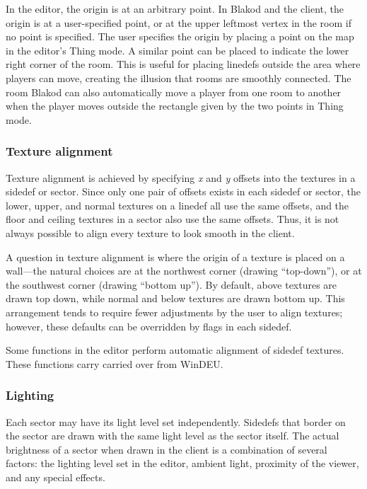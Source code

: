 In the editor, the origin is at an arbitrary point.  In Blakod and the
client, the origin is at a user-specified point, or at the upper
leftmost vertex in the room if no point is specified.  The user
specifies the origin by placing a point on the map in the editor's
Thing mode.  A similar point can be placed to indicate the lower right
corner of the room.  This is useful for placing linedefs outside the
area where players can move, creating the illusion that rooms are
smoothly connected.  The room Blakod can also automatically move a
player from one room to another when the player moves outside the
rectangle given by the two points in Thing mode.

\subsubsection{Texture alignment}

Texture alignment is achieved by specifying {\em x} and {\em y}
offsets into the textures in a sidedef or sector.  Since only one pair
of offsets exists in each sidedef or sector, the lower, upper, and
normal textures on a linedef all use the same offsets, and the floor
and ceiling textures in a sector also use the same offsets.  Thus, it
is not always possible to align every texture to look smooth in the
client.

A question in texture alignment is where the origin of a texture is
placed on a wall---the natural choices are at the northwest corner
(drawing ``top-down''), or at the southwest corner (drawing ``bottom
up'').  By default, above textures are drawn top down, while normal
and below textures are drawn bottom up.  This arrangement tends to
require fewer adjustments by the user to align textures; however,
these defaults can be overridden by flags in each sidedef.

Some functions in the editor perform automatic alignment of sidedef
textures.  These functions carry carried over from WinDEU.

\subsubsection{Lighting}

Each sector may have its light level set independently.  Sidedefs that
border on the sector are drawn with the same light level as the sector
itself.  The actual brightness of a sector when drawn in the client is
a combination of several factors:  the lighting level set in the
editor, ambient light, proximity of the viewer, and any special
effects.

